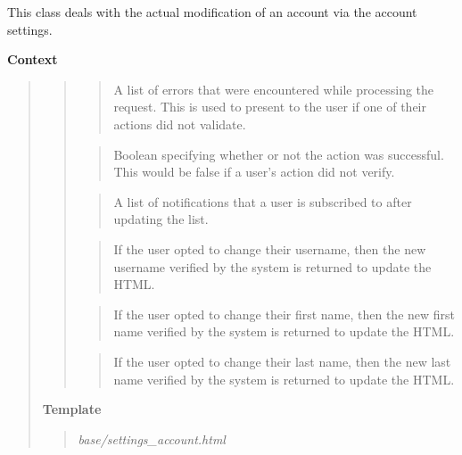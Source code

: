 \documentclass[letterpaper,10pt,english]{sphinxmanual}
\begin{document}
\begin{fulllineitems}
\label{modules/webapp:webapp.views.settings_account}
This class deals with the actual modification of an account
via the account settings.

\textbf{Context}
\begin{quote}
\begin{quote}

\begin{quote}

A list of errors that were encountered while processing the
request. This is used to present to the user if one of their
actions did not validate.
\end{quote}

\begin{quote}

Boolean specifying whether or not the action was successful.
This would be false if a user's action did not verify.
\end{quote}

\begin{quote}

A list of notifications that a user is subscribed to
after updating the list.
\end{quote}

\begin{quote}

If the user opted to change their username, then the new
username verified by the system is returned to update the
HTML.
\end{quote}

\begin{quote}

If the user opted to change their first name, then the new
first name verified by the system is returned to update the
HTML.
\end{quote}

\begin{quote}

If the user opted to change their last name, then the new
last name verified by the system is returned to update the
HTML.
\end{quote}
\end{quote}

\textbf{Template}
\begin{quote}

\emph{base/settings\_account.html}
\end{quote}
\end{quote}

\end{fulllineitems}
\end{document}
